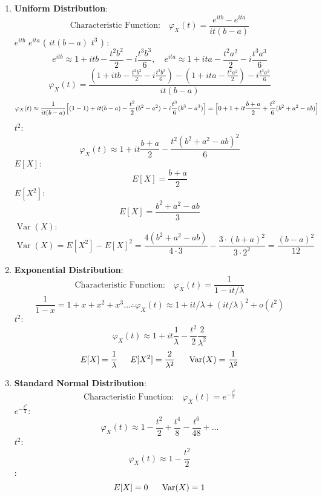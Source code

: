 \begin{enumerate}[label=(\alph*)]
\begin{enumerate}[label=(\alph*)]
\item
\textbf{Uniform Distribution}:
\[
\text{Characteristic Function:} \quad \varphi_X(t) = \frac{e^{itb} - e^{ita}}{it(b-a)}
\]
 \( e^{itb} \)  \( e^{ita} \) (    \(it(b-a) \)  \(t^3\) ) : 
\[
e^{itb} \approx 1 + itb - \frac{t^2b^2}{2} - i\frac{t^3b^3}{6}, \quad e^{ita} \approx 1 + ita - \frac{t^2a^2}{2} - i\frac{t^3a^3}{6}
\]
\[
\varphi_X(t) = \frac{(1 + itb - \frac{t^2b^2}{2}- i\frac{t^3b^3}{6}) - (1 + ita - \frac{t^2a^2}{2}) - i\frac{t^3a^3}{6}}{it(b-a)}
\]
\[
\varphi_X(t) \approx \frac{1}{it(b-a)} \Bigl[ (1-1)+ it(b-a) -\dfrac{t^2}{2}(b^2-a^2) -i\dfrac{t^3}{6}(b^3-a^3) \Bigr] = \Bigl[ 0 + 1 +it\dfrac{b+a}{2}  + \dfrac{t^2}{6} (b^2+a^2 -ab) \Bigr]
\]
 \( t^2 \):
\[
\varphi_X(t) \approx 1 + it\frac{b+a}{2} - \frac{t^2(b^2 + a^2-ab)^2}{6}
\]
 \( E[X] \):
\[
E[X] = \frac{b+a}{2}
\]
 \( E[X^2] \):
\[
E[X] = \frac{b^2+a^2-ab}{3}
\]
 \( \operatorname{Var}(X) \):
\[
\operatorname{Var}(X) = E[X^2] - E[X]^2 =  \frac{4(b^2+a^2-ab)}{4\cdot3} - \frac{3\cdot(b+a)^2}{3\cdot2^2}  = \frac{(b-a)^2}{12}
\]


\item
\textbf{Exponential Distribution}:
\[
\text{Characteristic Function:} \quad \varphi_X(t) = \frac{1}{1 - it/\lambda}
\]
\[
\frac{1}{1-x} = 1 +x + x^2 +x^3... \therefore \varphi_X(t) \approx 1 + it/\lambda + (it/\lambda)^2 + o(t^2)
\]
 \( t^2 \):
\[
\varphi_X(t) \approx 1 + it \dfrac{1}{\lambda} - \frac{t^2}{2} \frac{2}{\lambda^2}
\]
\[
E[X] = \frac{1}{\lambda} \hspace{15pt} E[X^2] = \frac{2}{\lambda^2} \hspace*{15pt} \operatorname{Var}(X) = \frac{1}{\lambda^2}
\]


\item
\textbf{Standard Normal Distribution}:
\[
\text{Characteristic Function:} \quad \varphi_X(t) = e^{-\frac{t^2}{2}}
\]
 \( e^{-\frac{t^2}{2}} \):
\[
\varphi_X(t) \approx 1 - \frac{t^2}{2} + \frac{t^4}{8} - \frac{t^6}{48} + \ldots
\]
 \( t^2 \):
\[
\varphi_X(t) \approx 1 - \frac{t^2}{2}
\]
:
\[
E[X] = 0 \hspace*{15pt} \operatorname{Var}(X) = 1
\]

\end{enumerate}


\end{enumerate}
